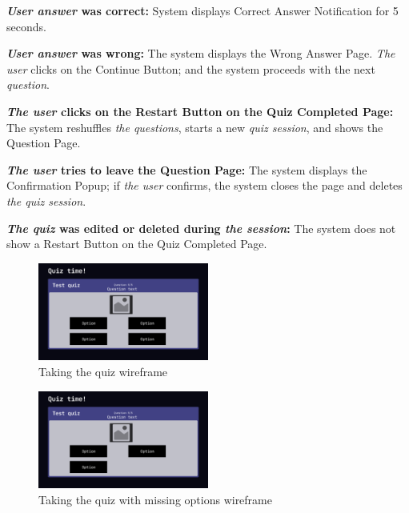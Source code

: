 \documentclass[
    english, %
]{VUMIFPSkursinis}
\begin{document}
\textbf{\textit{User answer} was correct:} System displays Correct Answer Notification for 5 seconds.

\textbf{\textit{User answer} was wrong:} The system displays the Wrong Answer Page. \textit{The user} clicks on the Continue Button; and the system proceeds with the next \textit{question}.

\textbf{\textit{The user} clicks on the Restart Button on the Quiz Completed Page:} The system reshuffles \textit{the questions}, starts a new \textit{quiz session}, and shows the Question Page.

\textbf{\textit{The user} tries to leave the Question Page:} The system displays the Confirmation Popup; if \textit{the user} confirms, the system closes the page and deletes \textit{the quiz session}.

\textbf{\textit{The quiz} was edited or deleted during \textit{the session}:} The system does not show a Restart Button on the Quiz Completed Page.

\pagebreak

\begin{figure}[ht]
    \centering
    \includegraphics[width=0.5\textwidth]{../lab3diags/taking-quiz-wireframes/Quiz play.png}
    \caption{Taking the quiz wireframe}
    \label{wireframe-quiz-play} 
\end{figure}

\begin{figure}[ht]
    \centering
    \includegraphics[width=0.5\textwidth]{../lab3diags/Quiz play with missing options.png}
    \caption{Taking the quiz with missing options wireframe}
    \label{wireframe-quiz-play-missing} 
\end{figure}
\end{document}
